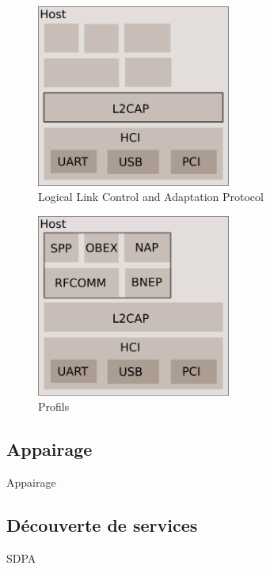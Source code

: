 \begin{frame}
\begin{figure}
\includegraphics[height=6cm]{arch_log_l2cap.png}
\caption{Logical Link Control and Adaptation Protocol}
\end{figure}
\end{frame}

\begin{frame}
\begin{figure}
\includegraphics[height=6cm]{arch_log_all.png}
\caption{Profils}
\end{figure}
\end{frame}

\subsection{Appairage}
\begin{frame}
Appairage
\end{frame}

\subsection{Découverte de services}
\begin{frame}
SDPA
\end{frame}
